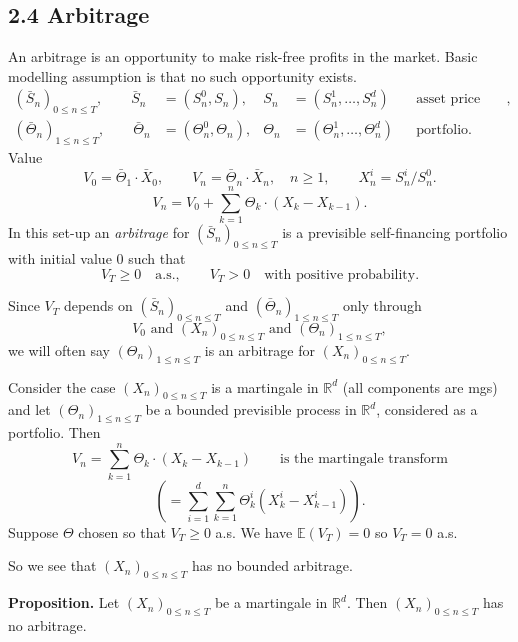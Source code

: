 \documentclass[11pt,a4paper]{article}
\begin{document}
\subsection*{2.4 Arbitrage}

An arbitrage is an opportunity to make risk-free profits in the market.
Basic modelling assumption is that no such opportunity exists.
\[
\begin{aligned}
(\bar S_n)_{0\leq n\leq T},\qquad
\bar S_n&=(S_n^0,S_n),& S_n&=(S_n^1,\ldots,S_n^d)
&&\text{asset price model},\\
(\bar\Theta_n)_{1\leq n\leq T},\qquad
\bar\Theta_n&=(\Theta_n^0,\Theta_n),&
\Theta_n&=(\Theta_n^1,\ldots,\Theta_n^d)
&&\text{portfolio}.
\end{aligned}
\]
Value
\[
V_0=\bar\Theta_1\cdot\bar X_0,\qquad
V_n=\bar\Theta_n\cdot\bar X_n,\quad n\geq1,
\qquad X_n^i=S_n^i/S_n^0.
\]
\[
V_n=V_0+\sum_{k=1}^n\Theta_k\cdot(X_k-X_{k-1}).
\]
In this set-up an \emph{arbitrage} for $(\bar S_n)_{0\leq n\leq T}$
is a previsible self-financing portfolio with initial value $0$ such that
\[
V_T\geq0\quad\text{a.s.},\qquad
V_T>0\quad\text{with positive probability}.
\]

Since $V_T$ depends on $(\bar S_n)_{0\leq n\leq T}$ and
$(\bar\Theta_n)_{1\leq n\leq T}$ only through
\[
V_0\text{ and }(X_n)_{0\leq n\leq T}\text{ and }(\Theta_n)_{1\leq n\leq T},
\]
we will often say $(\Theta_n)_{1\leq n\leq T}$ is an arbitrage for
$(X_n)_{0\leq n\leq T}$.

Consider the case $(X_n)_{0\leq n\leq T}$ is a martingale in $\mathbb R^d$
(all components are mgs) and let $(\Theta_n)_{1\leq n\leq T}$ be a bounded
previsible process in $\mathbb R^d$, considered as a portfolio.
Then
\[
V_n=\sum_{k=1}^n\Theta_k\cdot(X_k-X_{k-1})
\qquad\text{is the martingale transform}
\]
\[
\left(=\sum_{i=1}^d\sum_{k=1}^n\Theta_k^i(X_k^i-X_{k-1}^i)\right).
\]
Suppose $\Theta$ chosen so that $V_T\geq0$ a.s.
We have $\mathbb E(V_T)=0$ so $V_T=0$ a.s.

So we see that $(X_n)_{0\leq n\leq T}$ has no bounded arbitrage.

\medskip
\noindent\textbf{Proposition.}
Let $(X_n)_{0\leq n\leq T}$ be a martingale in $\mathbb R^d$.
Then $(X_n)_{0\leq n\leq T}$ has no arbitrage.
\end{document}
